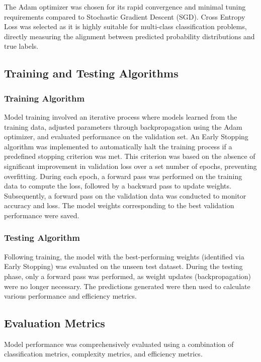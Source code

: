 \documentclass[preprint,12pt]{elsarticle}
\begin{document}
The Adam optimizer was chosen for its rapid convergence and minimal tuning requirements compared to Stochastic Gradient Descent (SGD). Cross Entropy Loss was selected as it is highly suitable for multi-class classification problems, directly measuring the alignment between predicted probability distributions and true labels.

\subsection{Training and Testing Algorithms}

\subsubsection{Training Algorithm}

Model training involved an iterative process where models learned from the training data, adjusted parameters through backpropagation using the Adam optimizer, and evaluated performance on the validation set. An Early Stopping algorithm was implemented to automatically halt the training process if a predefined stopping criterion was met. This criterion was based on the absence of significant improvement in validation loss over a set number of epochs, preventing overfitting. During each epoch, a forward pass was performed on the training data to compute the loss, followed by a backward pass to update weights. Subsequently, a forward pass on the validation data was conducted to monitor accuracy and loss. The model weights corresponding to the best validation performance were saved.

\subsubsection{Testing Algorithm}

Following training, the model with the best-performing weights (identified via Early Stopping) was evaluated on the unseen test dataset. During the testing phase, only a forward pass was performed, as weight updates (backpropagation) were no longer necessary. The predictions generated were then used to calculate various performance and efficiency metrics.

\subsection{Evaluation Metrics}

Model performance was comprehensively evaluated using a combination of classification metrics, complexity metrics, and efficiency metrics.
\end{document}
